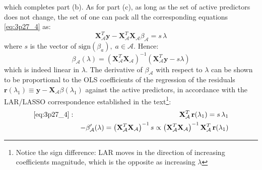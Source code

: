 which completes part (b). As for part (c), as long as the set of active predictors
does not change, the set of one can pack all the corresponding equations
\eqref{eq:3p27_4} as:
\begin{equation*}
\mathbf{X}_\mathcal{A}^T \mathbf{y} - \mathbf{X}_\mathcal{A}^T \mathbf{X}_\mathcal{A}
\beta_\mathcal{A} = s\, \lambda
\end{equation*}
where $s$ is the vector of $\textrm{sign}(\beta_a), \; a \in \mathcal{A}$. Hence:
\begin{equation*}
\beta_\mathcal{A}(\lambda) = \left(\mathbf{X}_\mathcal{A}^T \mathbf{X}_\mathcal{A}\right)^{-1} \left(\mathbf{X}_\mathcal{A}^T \mathbf{y} - s \lambda\right)
\end{equation*}
which is indeed linear in $\lambda$. The derivative of $\beta_\mathcal{A}$ with respect to $\lambda$ can be shown to be proportional to the OLS coefficients of the regression of the residuals $\mathbf{r}(\lambda_1) \equiv \mathbf{y} - \mathbf{X}_\mathcal{A} \beta(\lambda_1)$
against the active predictors, in accordance with the LAR/LASSO correspondence
established in the text\footnote{Notice the sign difference: LAR moves in the direction of increasing coefficients magnitude, which is the opposite as
    increasing $\lambda$}:
\begin{eqnarray*}
    \eqref{eq:3p27_4}: && \quad \mathbf{X}_\mathcal{A}^T\, \mathbf{r}(\lambda_1) = s\, \lambda_1 \\ &&
    - \beta_\mathcal{A}'(\lambda) = \left(\mathbf{X}_\mathcal{A}^T \mathbf{X}_\mathcal{A}\right)^{-1} s \propto \left(\mathbf{X}_\mathcal{A}^T \mathbf{X}_\mathcal{A}\right)^{-1} \mathbf{X}_\mathcal{A}^T\, \mathbf{r}(\lambda_1)
    \end{eqnarray*}

